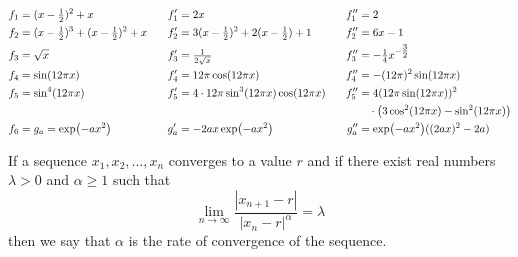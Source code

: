 \fontsize{10}{12}\selectfont
\begin{alignat*}{3}
	f_1 &=(x-\tfrac{1}{2})^2+x
		& f_1' &=2x
		& f_1'' &=2 \\
	f_2 &=(x-\tfrac{1}{2})^3+(x-\tfrac{1}{2})^2+x \hspace{0.3cm}
		& f_2' &= 3(x-\tfrac{1}{2})^2+2(x-\tfrac{1}{2})+1
		& f_2'' &= 6x-1\\
	f_3 &= \sqrt{x}
		& f_3' &=\tfrac{1}{2\sqrt{x}}
		& f_3'' &=-\tfrac{1}{4}x^{-\tfrac{3}{2}} \\
	f_4 &= \sin(12\pi x)
		& f_4' &= 12 \pi \cos(12\pi x)
		& f_4'' &= -(12\pi)^2 \sin(12\pi x)\\
	f_5 &= \sin^4(12\pi x)
		& f_5' &= 4 \cdot 12\pi \sin^3(12\pi x) \cos(12\pi x) \hspace{0.3cm}
		&  f_5'' &= 4  (12\pi \sin(12\pi x))^2 \\ & & & & &~~~\cdot\big(3\cos^2(12\pi x) - \sin^2(12\pi x) \big) \\
	f_6 &=g_a = \exp(-ax^2)
		& g_a' &= -2ax\exp(-ax^2)
		& g_a'' &= \exp(-ax^2) ((2ax)^2-2a)\\
\end{alignat*}
\fontsize{12}{14}\selectfont

If a sequence $x_1,x_2,...,x_n$ converges to a value $r$ and if there exist real numbers $\lambda >0 $ and $\alpha \geq 1$ such that
\begin{equation}
	\lim_{n \to \infty} \frac{|x_{n+1}-r|}{|x_n-r|^\alpha}= \lambda
\end{equation} 
then we say that $\alpha$ is the rate of convergence of the sequence.

